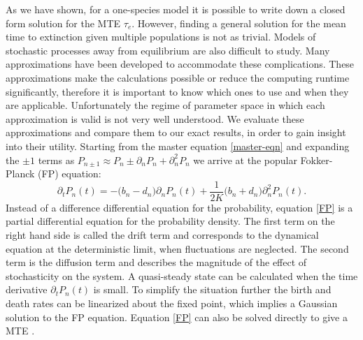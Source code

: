 \documentclass[a4paper,10pt]{article}
\numberwithin{equation}{section} %
\begin{document}
As we have shown, for a one-species model it is possible to write down a closed form solution for the MTE $\tau_e$.
However, finding a general solution for the mean time to extinction given multiple populations is not as trivial. 
Models of stochastic processes away from equilibrium are also difficult to study. 
Many approximations have been developed to accommodate these complications. 
These approximations make the calculations possible or reduce the computing runtime significantly, therefore it is important to know which ones to use and when they are applicable. 
Unfortunately the regime of parameter space in which each approximation is valid is not very well understood. 
We evaluate these approximations and compare them to our exact results, in order to gain insight into their utility. 
Starting from the master equation \ref{master-eqn} and expanding the $\pm 1$ terms as $P_{n\pm 1} \approx P_n \pm \partial_n P_n + \partial^2_n P_n$ we arrive at the popular Fokker-Planck (FP) equation:
\begin{equation}
\partial_t P_n(t) = - \Big( b_n - d_n \Big) \partial_n P_n(t) + \frac{1}{2 K} \Big( b_n + d_n \Big) \partial_n^2 P_n(t).  \label{FP}
\end{equation}
Instead of a difference differential equation for the probability, equation \ref{FP} is a partial differential equation for the probability density. 
The first term on the right hand side is called the drift term and corresponds to the dynamical equation at the deterministic limit, when fluctuations are neglected. 
The second term is the diffusion term and describes the magnitude of the effect of stochasticity on the system. 
A quasi-steady state can be calculated when the time derivative $\partial_t P_n(t)$ is small. 
To simplify the situation further the birth and death rates can be linearized about the fixed point, which implies a Gaussian solution to the FP equation. 
Equation \ref{FP} can also be solved directly to give a MTE \cite{Gardiner2004}. 
\end{document}
